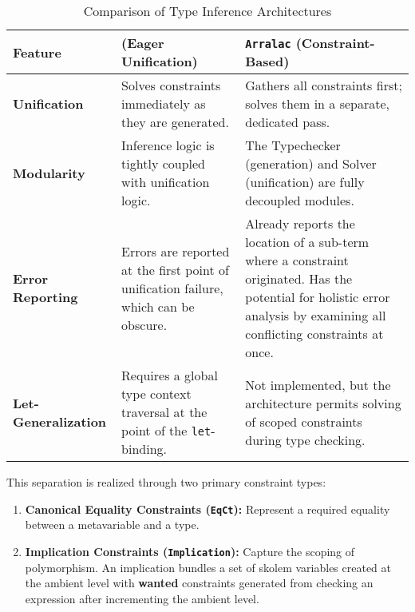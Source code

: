 \begin{table}[h!]
    \centering
    \small
    \caption{Comparison of Type Inference Architectures}
    \label{tab:arch-comparison}
    \begin{tabular}{p{} p{} p{}}
        \toprule
        \textbf{Feature}            & \textbf{\cite{jones-practical-2007} (Eager Unification)}                             & \textbf{\texttt{Arralac} (Constraint-Based)}                                                                                                                              \\
        \midrule
        \textbf{Unification}        & Solves constraints immediately as they are generated.                                & Gathers all constraints first; solves them in a separate, dedicated pass.                                                                                                 \\
        \textbf{Modularity}         & Inference logic is tightly coupled with unification logic.                           & The Typechecker (generation) and Solver (unification) are fully decoupled modules.                                                                                        \\
        \textbf{Error Reporting}    & Errors are reported at the first point of unification failure, which can be obscure. & Already reports the location of a sub-term where a constraint originated. Has the potential for holistic error analysis by examining all conflicting constraints at once. \\
        \textbf{Let-Generalization} & Requires a global type context traversal at the point of the \texttt{let}-binding.   & Not implemented, but the architecture permits solving of scoped constraints during type checking.                                                                         \\
        \bottomrule
    \end{tabular}
\end{table}

\newpage
This separation is realized through two primary constraint types:
\begin{enumerate}
    \item \textbf{Canonical Equality Constraints (\texttt{EqCt}):} Represent a required equality between a metavariable and a type.
    \item \textbf{Implication Constraints (\texttt{Implication}):} Capture the scoping of polymorphism. An implication bundles a set of skolem variables created at the ambient level with \textbf{wanted} \cite{wits-type-inference-using-constraints} constraints generated from checking an expression after incrementing the ambient level.
\end{enumerate}

